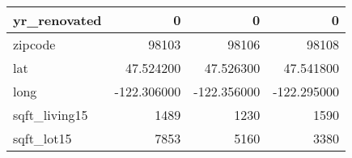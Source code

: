 \begin{table}[H]
\begin{tabular}{|l|r|r|r|}
\hline yr\_renovated & \cellcolor[rgb]{0.9, 0.54, 0.52} 0 & \cellcolor[rgb]{0.9, 0.54, 0.52} 0 & \cellcolor[rgb]{0.9, 0.54, 0.52} 0 \\
\hline zipcode & \cellcolor[rgb]{0.9, 0.54, 0.52} 98103 & 98106 & 98108 \\
\hline lat & \cellcolor[rgb]{0.9, 0.54, 0.52} 47.524200 & 47.526300 & 47.541800 \\
\hline long & \cellcolor[rgb]{0.9, 0.54, 0.52} -122.306000 & \cellcolor[rgb]{0.9, 0.54, 0.52} -122.356000 & \cellcolor[rgb]{0.9, 0.54, 0.52} -122.295000 \\
\hline sqft\_living15 & \cellcolor[rgb]{0.9, 0.54, 0.52} 1489 & 1230 & 1590 \\
\hline sqft\_lot15 & \cellcolor[rgb]{0.9, 0.54, 0.52} 7853 & 5160 & 3380 \\
\hline
\end{tabular}
\end{table}
